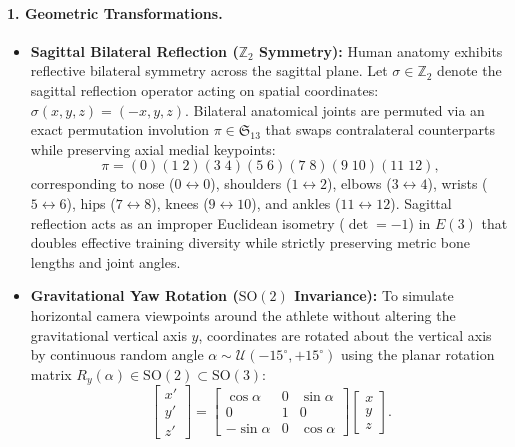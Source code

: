 \documentclass[preprint,12pt]{elsarticle}
\begin{document}
\paragraph{1. Geometric Transformations.}
\begin{itemize}
    \item \textbf{Sagittal Bilateral Reflection ($\mathbb{Z}_2$ Symmetry):} Human anatomy exhibits reflective bilateral symmetry across the sagittal plane. Let $\sigma \in \mathbb{Z}_2$ denote the sagittal reflection operator acting on spatial coordinates: $\sigma(x, y, z) = (-x, y, z)$. Bilateral anatomical joints are permuted via an exact permutation involution $\pi \in \mathfrak{S}_{13}$ that swaps contralateral counterparts while preserving axial medial keypoints:
    \begin{equation}
        \pi = (0)(1 \; 2)(3 \; 4)(5 \; 6)(7 \; 8)(9 \; 10)(11 \; 12),
    \end{equation}
    corresponding to nose ($0 \leftrightarrow 0$), shoulders ($1 \leftrightarrow 2$), elbows ($3 \leftrightarrow 4$), wrists ($5 \leftrightarrow 6$), hips ($7 \leftrightarrow 8$), knees ($9 \leftrightarrow 10$), and ankles ($11 \leftrightarrow 12$). Sagittal reflection acts as an improper Euclidean isometry ($\det = -1$) in $E(3)$ that doubles effective training diversity while strictly preserving metric bone lengths and joint angles.
    \item \textbf{Gravitational Yaw Rotation ($\mathrm{SO}(2)$ Invariance):} To simulate horizontal camera viewpoints around the athlete without altering the gravitational vertical axis $y$, coordinates are rotated about the vertical axis by continuous random angle $\alpha \sim \mathcal{U}(-15^\circ, +15^\circ)$ using the planar rotation matrix $R_y(\alpha) \in \mathrm{SO}(2) \subset \mathrm{SO}(3)$:
    \begin{equation}
    \label{eq:yaw_rotation}
        \begin{bmatrix} x' \\ y' \\ z' \end{bmatrix} = \begin{bmatrix} \cos\alpha & 0 & \sin\alpha \\ 0 & 1 & 0 \\ -\sin\alpha & 0 & \cos\alpha \end{bmatrix} \begin{bmatrix} x \\ y \\ z \end{bmatrix}.

\end{equation}
\end{itemize}
\end{document}
